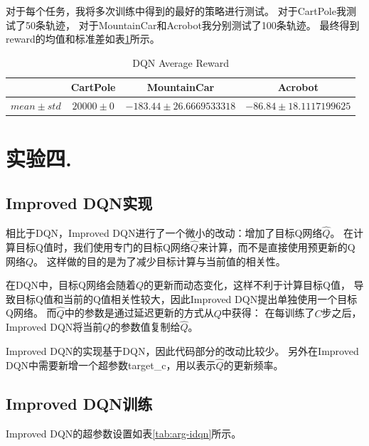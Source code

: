 \documentclass[a4paper,UTF8]{article}
\theoremstyle{definition}
\begin{document}
对于每个任务，我将多次训练中得到的最好的策略进行测试。
对于CartPole我测试了50条轨迹，
对于MountainCar和Acrobot我分别测试了100条轨迹。
最终得到reward的均值和标准差如表\ref{tab:reward-dqn}所示。

\begin{table}[H]
	\centering
	\caption{DQN Average Reward}\label{tab:reward-dqn}
	\begin{tabular}{c|ccc}
		\toprule
		& CartPole & MountainCar & Acrobot \\
		\midrule
		$mean \pm std$ & $20000 \pm 0$ & $-183.44 \pm 26.6669533318$ & $-86.84 \pm 18.1117199625$ \\
		\bottomrule
	\end{tabular}
\end{table}

\section*{实验四.}

\subsection*{Improved DQN实现}

相比于DQN，Improved DQN进行了一个微小的改动：增加了目标Q网络$\hat{Q}$。
在计算目标Q值时，我们使用专门的目标Q网络$\hat{Q}$来计算，而不是直接使用预更新的Q网络$Q$。
这样做的目的是为了减少目标计算与当前值的相关性。

在DQN中，目标Q网络会随着$Q$的更新而动态变化，这样不利于计算目标Q值，
导致目标Q值和当前的Q值相关性较大，因此Improved DQN提出单独使用一个目标Q网络。
而$\hat{Q}$中的参数是通过延迟更新的方式从$Q$中获得：
在每训练了$C$步之后，Improved DQN将当前$Q$的参数值复制给$\hat{Q}$。

Improved DQN的实现基于DQN，因此代码部分的改动比较少。
另外在Improved DQN中需要新增一个超参数target\_c，用以表示$\hat{Q}$的更新频率。

\subsection*{Improved DQN训练}

Improved DQN的超参数设置如表\ref{tab:arg-idqn}所示。
\end{document}
